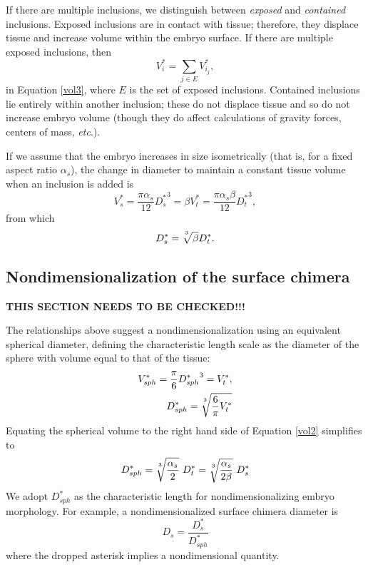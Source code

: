 \documentclass[10pt,a4paper]{article}
\def\non{\nonumber}
\def\etc{\emph{etc}.\xspace}
\begin{document}
If there are multiple inclusions, we distinguish between \textit{exposed} and \textit{contained} inclusions. 
Exposed inclusions are in contact with tissue; therefore, they displace tissue and increase volume within the embryo surface.  
If there are multiple exposed inclusions, then 
\begin{equation}\label{eqn:expincl}
	V_i^* = \sum_{j \in E} V^*_{i_j},
\end{equation}
in  Equation \ref{vol3}, where $E$ is the set of exposed inclusions.
Contained inclusions lie entirely within another inclusion; these do not displace tissue and so do not increase embryo volume (though they do affect calculations of gravity forces, centers of mass, \etc).


If we assume that the embryo increases in size isometrically (that is, for a fixed aspect ratio $\alpha_s$), the change in diameter to maintain a constant tissue volume when an inclusion is added is
\begin{equation}\label{vol4}
	V_s^*  = \frac{\pi \alpha_s}{12}{D_s^*}^3 = \beta V_t^* = \frac{\pi \alpha_s \beta}{12}{D_t^*}^3,
\end{equation} 
from which 
\begin{equation}\label{vol5}
	D_s^* = \sqrt[\uproot{5}3]{\beta} D_t^*.
\end{equation}




\subsection{Nondimensionalization of the surface chimera}
\textbf{THIS SECTION NEEDS TO BE CHECKED!!!}

The relationships above suggest a nondimensionalization using an equivalent spherical diameter, defining the characteristic length scale as the diameter of the sphere with volume equal to that of the tissue:
\begin{eqnarray}\label{equivsphere}
	V_{sph}^* = \frac{\pi}{6} {D_{sph}^*}^3 = V_t^*, \non \\
	D_{sph}^* = \sqrt[\uproot{5}3]{\frac{6}{\pi} V_t^*}
\end{eqnarray} 
Equating the spherical volume to the right hand side of Equation \ref{vol2} simplifies to
\begin{equation}\label{equivD}
	D_{sph}^* = \sqrt[\uproot{5}3]{\frac{\alpha_s}{2}} ~ D_t^* = \sqrt[\uproot{5}3]{\frac{\alpha_s}{2 \beta}} ~ D_s^*
\end{equation} 
We adopt $D_{sph}^*$ as the characteristic length for nondimensionalizing embryo morphology.
For example, a nondimensionalized surface chimera diameter is
\begin{equation}\label{ndD}
	D_s = \frac{D_s^*}{D_{sph}^*}
\end{equation} 
where the dropped asterisk implies a nondimensional quantity.
\end{document}
